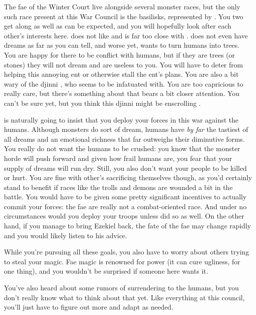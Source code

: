 \documentclass[char]{guildcamp2}
\begin{document}
The fae of the Winter Court live alongside several monster races, but the only such race present at this War Council is the basilisks, represented by \cBasilisk{\intro}. You two get along as well as can be expected, and you will hopefully look after each other's interests here. \cTreeFae{} does not like \cBasilisk{} and is far too close with \cEnt{\intro}. \cEnt{\intro} does not even have dreams as far as you can tell, and worse yet, \cEnt{\intro} wants to turn humans into trees. You are happy for there to be conflict with humans, but if they are trees (or stones) they will not dream and are useless to you. You will have to deter \cTreeFae{} from helping this annoying ent or otherwise stall the ent's plans. You are also a bit wary of the djinni \cWizard{}, who \cTreeFae{} seems to be infatuated with. You are too capricious to really care, but there's something about \cWizard{} that bears a bit closer attention. You can't be sure yet, but you think this djinni might be enscrolling \cTreeFae{}.

\cOnyx{} is naturally going to insist that you deploy your forces in this war against the humans. Although monsters do sort of dream, humans have \emph{by far} the tastiest of all dreams and an emotional richness that far outweighs their diminutive forms. You really do not want the humans to be crushed: you know that the monster horde will push forward and given how frail humans are, you fear that your supply of dreams will run dry. Still, you also don't want your people to be killed or hurt. You are fine with other's sacrificing themselves though, as you'd certainly stand to benefit if races like the trolls and demons are wounded a bit in the battle. You would have to be given some pretty significant incentives to actually commit your forces: the fae are really not a combat-oriented race. And under no circumstances would you deploy your troops unless \cTreeFae{} did so as well. On the other hand, if you manage to bring Ezekiel back, the fate of the fae may change rapidly and you would likely listen to his advice.

While you're pursuing all these goals, you also have to worry about others trying to steal your magic.  Fae magic is renowned for power (it can cure ugliness, for one thing), and you wouldn't be surprised if someone here wants it.

You've also heard about some rumors of surrendering to the humans, but you don't really know what to think about that yet. Like everything at this council, you'll just have to figure out more and adapt as needed. 
\end{document}
